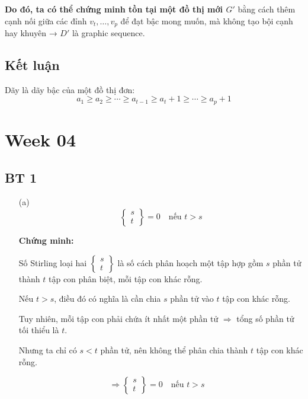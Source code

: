 \documentclass{article}
\begin{document}
	\textbf{Do đó, ta có thể chứng minh tồn tại một đồ thị mới \( G' \)} bằng cách thêm cạnh nối giữa các đỉnh \( v_t, \ldots, v_p \) để đạt bậc mong muốn, mà không tạo bội cạnh hay khuyên → \( D' \) là graphic sequence.
	
	\subsection*{Kết luận}
	
	Dãy là dãy bậc của một đồ thị đơn:
	\[
	a_1 \geq a_2 \geq \cdots \geq a_{t-1} \geq a_t + 1 \geq \cdots \geq a_p + 1
	\]
	
	\newpage
	\section*{Week 04}
	\subsection*{BT 1}
	\begin{enumerate}
		\item[(a)] 
		\[
		\left\{ \begin{matrix}
			s \\
			t
		\end{matrix} \right\} = 0 \quad \text{nếu } t > s
		\]
		
		\textbf{Chứng minh:}
		
		Số Stirling loại hai $\left\{ \begin{matrix}
			s \\
			t
		\end{matrix} \right\}$ là số cách phân hoạch một tập hợp gồm $s$ phần tử thành $t$ tập con phân biệt, mỗi tập con khác rỗng.
		
		Nếu $t > s$, điều đó có nghĩa là cần chia $s$ phần tử vào $t$ tập con khác rỗng.
		
		Tuy nhiên, mỗi tập con phải chứa ít nhất một phần tử $\Rightarrow$ tổng số phần tử tối thiểu là $t$. 
		
		Nhưng ta chỉ có $s < t$ phần tử, nên không thể phân chia thành $t$ tập con khác rỗng.
		
		\[
		\Rightarrow \left\{ \begin{matrix}
			s \\
			t
		\end{matrix} \right\} = 0 \quad \text{nếu } t > s \quad
		\]
	\end{enumerate}
	
\end{document}
